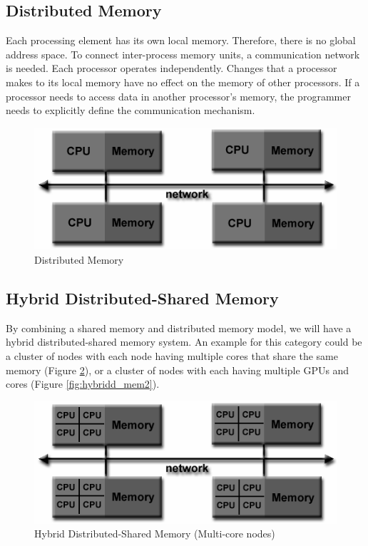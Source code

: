 \subsection{Distributed Memory}
Each processing element has its own local memory. Therefore, there is no global address space. To connect inter-process memory units, a communication network is needed.
Each processor operates independently. Changes that a processor makes to its local memory have no effect on the memory of other processors. If a processor needs to access data in another processor's memory, the programmer needs to explicitly define the communication mechanism.

\begin{figure}[ht]
  \centering
  \includegraphics[scale=0.6]{images/distributed_mem.png}
  \caption{Distributed Memory}
  \label{fig:distributed_mem}
\end{figure}

\subsection{Hybrid Distributed-Shared Memory}
By combining a shared memory and distributed memory model, we will have a hybrid distributed-shared memory system. An example for this category could be a cluster of nodes with each node having multiple cores that share the same memory (Figure \ref{fig:hybridd_mem}), or a cluster of nodes with each having multiple GPUs and cores (Figure \ref{fig:hybridd_mem2}).

\begin{figure}[ht]
  \centering
  \includegraphics[scale=0.6]{images/hybrid_mem.png}
  \caption{Hybrid Distributed-Shared Memory (Multi-core nodes)}
  \label{fig:hybridd_mem}
\end{figure}


